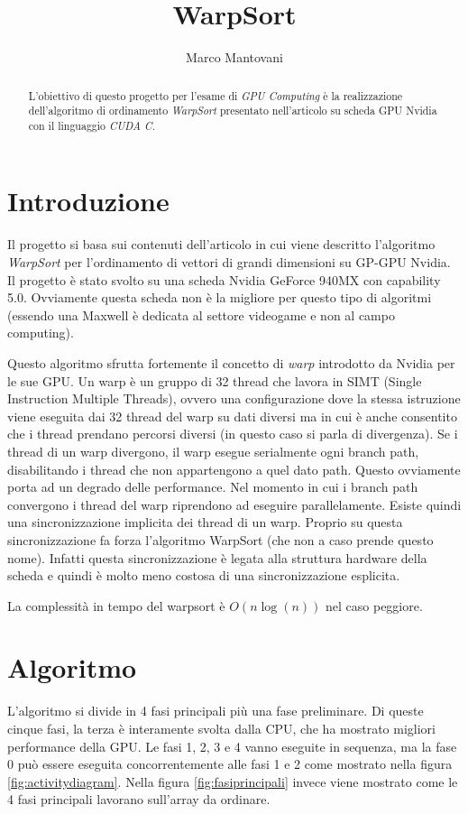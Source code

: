 \documentclass[a4paper, 11pt]{article}
\author{Marco Mantovani}
\title{WarpSort}
\begin{document}
	\maketitle
	\begin{abstract}
		L'obiettivo di questo progetto per l'esame di \emph{GPU Computing} è la realizzazione dell'algoritmo di ordinamento \emph{WarpSort}
		presentato nell'articolo \cite{main} su scheda GPU Nvidia con il linguaggio \emph{CUDA C}.
	\end{abstract}
	\section{Introduzione}
		Il progetto si basa sui contenuti dell'articolo \cite{main} in cui viene descritto 
		l'algoritmo \emph{WarpSort} per l'ordinamento di vettori
		di grandi dimensioni su GP-GPU Nvidia.
		Il progetto è stato svolto su una scheda Nvidia GeForce 940MX \cite{GeForce}
		con capability 5.0. Ovviamente questa scheda non
		è la migliore per questo tipo di algoritmi (essendo una Maxwell è dedicata al settore videogame e non al campo computing). 
		
		Questo algoritmo sfrutta fortemente il concetto di \emph{warp} introdotto da Nvidia per le sue GPU.
		Un warp è un gruppo di 32 thread che lavora in SIMT (Single Instruction Multiple Threads), ovvero una configurazione
		dove la stessa istruzione viene eseguita dai 32 thread del warp su dati diversi ma in cui è anche consentito che i thread prendano
		percorsi diversi (in questo caso si parla di divergenza). 
		Se i thread di un warp divergono, il warp esegue serialmente ogni branch path,  disabilitando i thread che non appartengono a quel dato 
		path. Questo ovviamente porta ad un degrado delle performance. Nel momento in cui i branch path convergono i thread del warp 
		riprendono ad eseguire parallelamente. Esiste quindi una sincronizzazione implicita dei thread di un warp. Proprio su questa 
		sincronizzazione fa forza l'algoritmo WarpSort (che non a caso prende questo nome).
		Infatti questa sincronizzazione è legata alla struttura hardware della scheda e quindi è molto meno costosa di una sincronizzazione 
		esplicita.
	
		La complessità in tempo del warpsort è $O(n \log(n))$ nel caso peggiore.
	\section{Algoritmo}
		L'algoritmo si divide in 4 fasi principali più una fase preliminare. 
		Di queste cinque fasi, la terza è interamente svolta dalla CPU, che ha mostrato migliori performance della GPU.
		Le fasi 1, 2, 3 e 4 vanno eseguite in sequenza, ma la fase 0 può essere eseguita concorrentemente alle fasi 1 e 2 come mostrato
		nella figura \ref{fig:activitydiagram}.
		Nella figura \ref{fig:fasiprincipali} invece viene mostrato come le 4 fasi principali lavorano sull'array da ordinare.
		
\end{document}
